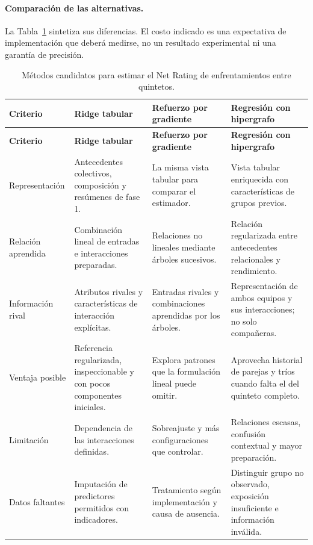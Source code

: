 \paragraph*{Comparación de las alternativas.}
La Tabla~\ref{tab:algoritmos-fase2} sintetiza sus diferencias. El costo indicado es una expectativa de implementación que deberá medirse, no un resultado experimental ni una garantía de precisión.

\begingroup
\small
{}
\setlength{\tabcolsep}{3pt}
\renewcommand{\arraystretch}{1.15}
\begin{longtable}{@{}>{\raggedright\arraybackslash}p{2.3cm}>{\raggedright\arraybackslash}p{3.55cm}>{\raggedright\arraybackslash}p{3.55cm}>{\raggedright\arraybackslash}p{3.55cm}@{}}
\caption{Métodos candidatos para estimar el Net Rating de enfrentamientos entre quintetos.}
\label{tab:algoritmos-fase2}\\
\toprule
\textbf{Criterio}&\textbf{Ridge tabular}&\textbf{Refuerzo por gradiente}&\textbf{Regresión con hipergrafo}\\
\midrule\endfirsthead
\toprule
\textbf{Criterio}&\textbf{Ridge tabular}&\textbf{Refuerzo por gradiente}&\textbf{Regresión con hipergrafo}\\
\midrule\endhead
\bottomrule\endfoot
Representa\-ción & Antecedentes colectivos, composición y resúmenes de fase 1. & La misma vista tabular para comparar el estimador. & Vista tabular enriquecida con características de grupos previos.\\
Relación aprendida & Combinación lineal de entradas e interacciones preparadas. & Relaciones no lineales mediante árboles sucesivos. & Relación regularizada entre antecedentes relacionales y rendimiento.\\
Información rival & Atributos rivales y características de interacción explícitas. & Entradas rivales y combinaciones aprendidas por los árboles. & Representación de ambos equipos y sus interacciones; no solo compañeras.\\
Ventaja posible & Referencia regularizada, inspeccionable y con pocos componentes iniciales. & Explora patrones que la formulación lineal puede omitir. & Aprovecha historial de parejas y tríos cuando falta el del quinteto completo.\\
Limitación & Dependencia de las interacciones definidas. & Sobreajuste y más configuraciones que controlar. & Relaciones escasas, confusión contextual y mayor preparación.\\
Datos faltantes & Imputación de predictores permitidos con indicadores. & Tratamiento según implementación y causa de ausencia. & Distinguir grupo no observado, exposición insuficiente e información inválida.\\

\end{longtable}
